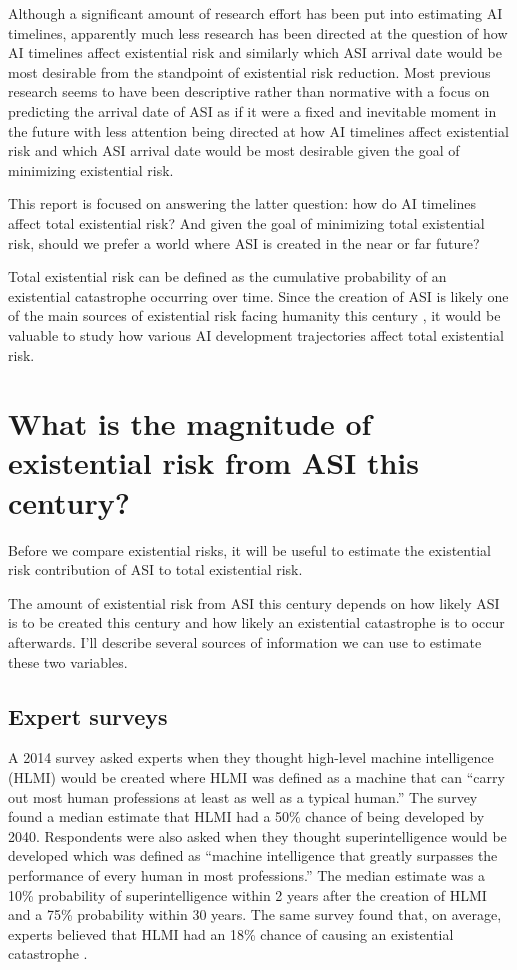 \documentclass{article}
\begin{document}
Although a significant amount of research effort has been put into estimating AI timelines, apparently much less research has been directed at the question of how AI timelines affect existential risk and similarly which ASI arrival date would be most desirable from the standpoint of existential risk reduction. Most previous research seems to have been descriptive rather than normative with a focus on predicting the arrival date of ASI as if it were a fixed and inevitable moment in the future with less attention being directed at how AI timelines affect existential risk and which ASI arrival date would be most desirable given the goal of minimizing existential risk.

This report is focused on answering the latter question: how do AI timelines affect total existential risk? And given the goal of minimizing total existential risk, should we prefer a world where ASI is created in the near or far future?

Total existential risk can be defined as the cumulative probability of an existential catastrophe occurring over time. Since the creation of ASI is likely one of the main sources of existential risk facing humanity this century \cite{theprecipice}, it would be valuable to study how various AI development trajectories affect total existential risk.

\section{What is the magnitude of existential risk from ASI this century?}

Before we compare existential risks, it will be useful to estimate the existential risk contribution of ASI to total existential risk.

The amount of existential risk from ASI this century depends on how likely ASI is to be created this century and how likely an existential catastrophe is to occur afterwards. I’ll describe several sources of information we can use to estimate these two variables.

\subsection{Expert surveys}

A 2014 survey asked experts when they thought high-level machine intelligence (HLMI) would be created where HLMI was defined as a machine that can “carry out most human professions at least as well as a typical human.” The survey found a median estimate that HLMI had a 50\% chance of being developed by 2040. Respondents were also asked when they thought superintelligence would be developed which was defined as “machine intelligence that greatly surpasses the performance of every human in most professions.” The median estimate was a 10\% probability of superintelligence within 2 years after the creation of HLMI and a 75\% probability within 30 years. The same survey found that, on average, experts believed that HLMI had an 18\% chance of causing an existential catastrophe \cite{survey}.
\end{document}

